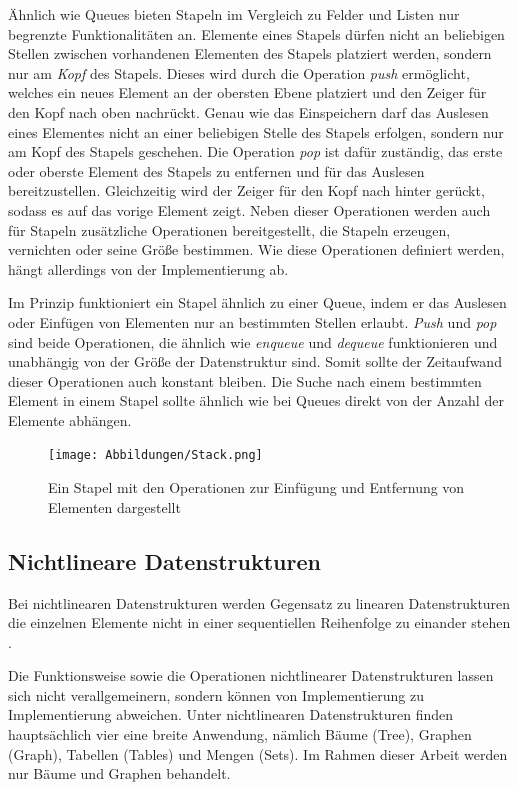 Ähnlich wie Queues bieten Stapeln im Vergleich zu Felder und Listen nur begrenzte Funktionalitäten an. Elemente eines Stapels dürfen nicht an beliebigen Stellen zwischen vorhandenen Elementen des Stapels platziert werden, sondern nur am \textit{Kopf} des Stapels. Dieses wird durch die Operation \textit{push} ermöglicht, welches ein neues Element an der obersten Ebene platziert und den Zeiger für den Kopf nach oben nachrückt. Genau wie das Einspeichern darf das Auslesen eines Elementes nicht an einer beliebigen Stelle des Stapels erfolgen, sondern nur am Kopf des Stapels geschehen. Die Operation \textit{pop} ist dafür zuständig, das erste oder oberste Element des Stapels zu entfernen und für das Auslesen bereitzustellen. Gleichzeitig wird der Zeiger für den Kopf nach hinter gerückt, sodass es auf das vorige Element zeigt. Neben dieser Operationen werden auch für Stapeln zusätzliche Operationen bereitgestellt, die Stapeln erzeugen, vernichten oder seine Größe bestimmen. Wie diese Operationen definiert werden, hängt allerdings von der Implementierung ab. \autocite[614]{ernst_grundkurs_2020} \autocite[45-46]{ollmert_datenstrukturen_2020}

Im Prinzip funktioniert ein Stapel ähnlich zu einer Queue, indem er das Auslesen oder Einfügen von Elementen nur an bestimmten Stellen erlaubt. \textit{Push} und \textit{pop} sind beide Operationen, die ähnlich wie \textit{enqueue} und \textit{dequeue} funktionieren und unabhängig von der Größe der Datenstruktur sind. Somit sollte der Zeitaufwand dieser Operationen auch konstant bleiben. Die Suche nach einem bestimmten Element in einem Stapel sollte ähnlich wie bei Queues direkt von der Anzahl der Elemente abhängen.

\begin{figure}[t]
	\texttt{[image: Abbildungen/Stack.png]}
	\centering
	\caption{Ein Stapel mit den Operationen zur Einfügung und Entfernung von Elementen dargestellt \autocite[371]{gumm_band_2016}}
	\label{fig: stack}
\end{figure}

\subsection{Nichtlineare Datenstrukturen} \label{nicht_lineare_datenstrukturen}
Bei nichtlinearen Datenstrukturen werden Gegensatz zu linearen Datenstrukturen die einzelnen Elemente nicht in einer sequentiellen Reihenfolge zu einander stehen \autocite[321]{hoffmann_einfuhrung_2011}. 

Die Funktionsweise sowie die Operationen nichtlinearer Datenstrukturen lassen sich nicht verallgemeinern, sondern können von Implementierung zu Implementierung abweichen. Unter nichtlinearen Datenstrukturen finden hauptsächlich vier eine breite Anwendung, nämlich Bäume (Tree), Graphen (Graph), Tabellen (Tables) und Mengen (Sets). Im Rahmen dieser Arbeit werden nur Bäume und Graphen behandelt.

